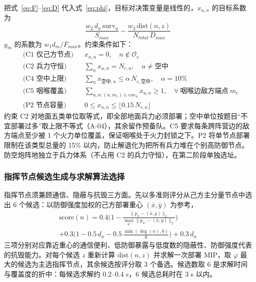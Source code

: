 \documentclass[12pt,a4paper]{ctexart}
\begin{document}
把式~\eqref{eq:F}--\eqref{eq:D} 代入式~\eqref{eq:phi}，目标对决策变量是线性的，$x_{u,n}$ 的目标系数为
\begin{equation}
\frac{w_2\,d_n\,\mathrm{surv}_u}{S_{max}}-\frac{w_3\,\mathrm{dist}(n,z)}{N_{total}\,D_{max}}
\label{eq:coef}
\end{equation}
$y_m$ 的系数为 $w_1 d_m/F_{max}$。约束条件如下：
\begin{align}
&\text{(C1 仅己方节点)} && x_{u,n}=0,\quad n\notin\mathcal{O}_c \label{eq:c1}\\
&\text{(C2 兵力守恒)} && \sum_{n}x_{u,n}=N_{c,u},\quad u\ne\text{空中} \label{eq:c2}\\
&\text{(C4 空中上限)} && \sum_{n}x_{\text{空中},n}\le \alpha\,N_{c,\text{空中}},\quad \alpha=10\% \label{eq:c4}\\
&\text{(C5 咽喉覆盖)} && \sum_{u,n:(n,m_e)\in\mathrm{cov}_u}x_{u,n}\ge 1,\quad \forall\ \text{咽喉边敌方端点}\ m_e \label{eq:c5}\\
&\text{(P2 节点容量)} && 0\le x_{u,n}\le \lfloor 0.15\,N_{c,u}\rfloor \label{eq:c9}
\end{align}
约束 C2 对地面五类单位取等式，即全部地面兵力必须部署；空中单位按题目“不宜部署过多”取上限不等式（A-04），其余留作预备队。C5 要求每条跨阵营边的敌方端点至少被 1 个火力单位覆盖，保证咽喉处于火力封锁之下。P2 将单节点部署限制在该类型总量的 15\% 以内，防止解退化为把所有兵力堆在个别高防御节点。防空炮阵地独立于兵力体系（不占用 C2 的兵力守恒），在第二阶段单独选址。

\subsubsection{指挥节点候选生成与求解算法选择}

指挥节点须兼顾通信、隐蔽与抗毁三方面。先以多准则评分从己方主分量节点中选出 6 个候选：以防御强度加权的己方部署重心 $(\bar x,\bar y)$ 为参考，
\begin{multline}
\mathrm{score}(n)=0.4\Big(1-\frac{\|p_n-(\bar x,\bar y)\|_2}{\max_{n'}\|p_{n'}-(\bar x,\bar y)\|_2}\Big)\\
+0.3\Big(1-0.5\,d_n-0.5\,\frac{\min(\deg(n),6)}{6}\Big)+0.3\,d_n
\label{eq:cmdscore}
\end{multline}
三项分别对应靠近重心的通信便利、低防御暴露与低度数的隐蔽性、防御强度代表的抗毁能力。对每个候选 $z$ 重新计算 $\mathrm{dist}(n,z)$ 并求解一次部署 MIP，取 $\varphi$ 最大的候选为主选指挥节点，其余候选按评分取 3 个备选。候选数取 6 是求解时间与覆盖度的折中：每候选求解约 0.2--0.4 s，6 候选总耗时在 3 s 以内。
\end{document}
